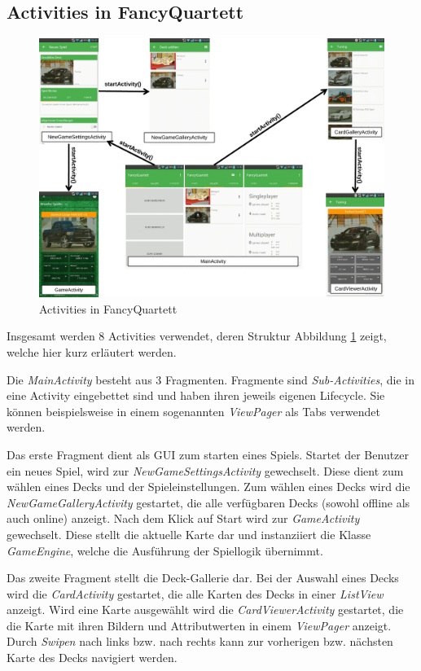 \subsection{Activities in FancyQuartett}
\label{sec:activities_in_fancyquartett}
\begin{figure}[ht]
    \centering
    \includegraphics[width=\textwidth]{../img/Activities.pdf}
    \caption{Activities in FancyQuartett}
    \label{fig:activities_in_fancyquartett}
\end{figure}

Insgesamt werden 8 Activities verwendet, deren Struktur Abbildung \ref{fig:activities_in_fancyquartett} zeigt, welche hier kurz erläutert werden.

Die \emph{MainActivity} besteht aus 3 Fragmenten. Fragmente sind \emph{Sub-Activities}, die in eine Activity eingebettet sind und haben ihren jeweils eigenen Lifecycle. Sie können beispielsweise in einem sogenannten \emph{ViewPager} als Tabs verwendet werden.

Das erste Fragment dient als GUI zum starten eines Spiels. Startet der Benutzer ein neues Spiel, wird zur \emph{NewGameSettingsActivity} gewechselt. Diese dient zum wählen eines Decks und der Spieleinstellungen. Zum wählen eines Decks wird die \emph{NewGameGalleryActivity} gestartet, die alle verfügbaren Decks (sowohl offline als auch online) anzeigt. Nach dem Klick auf Start wird zur \emph{GameActivity} gewechselt. Diese stellt die aktuelle Karte dar und instanziiert die Klasse \emph{GameEngine}, welche die Ausführung der Spiellogik übernimmt.

Das zweite Fragment stellt die Deck-Gallerie dar. Bei der Auswahl eines Decks wird die \emph{CardActivity} gestartet, die alle Karten des Decks in einer \emph{ListView} anzeigt. Wird eine Karte ausgewählt wird die \emph{CardViewerActivity} gestartet, die die Karte mit ihren Bildern und Attributwerten in einem \emph{ViewPager} anzeigt. Durch \emph{Swipen} nach links bzw. nach rechts kann zur vorherigen bzw. nächsten Karte des Decks navigiert werden.


